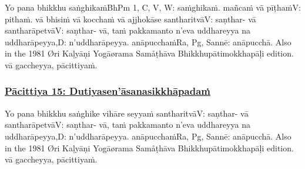 Yo pana bhikkhu saṅghikaṁ\makeatletter\hyperlink{endnote-appendix}\makeatother BhPm 1, C, V, W: saṁghikaṁ. mañcaṁ vā pīṭhaṁ\makeatletter\hyperlink{endnote-appendix}\makeatother V: pithaṁ. vā bhisiṁ vā kocchaṁ vā ajjhokāse santharitvā\makeatletter\hyperlink{endnote-appendix}\makeatother V: saṇthar- vā santharāpetvā\makeatletter\hyperlink{endnote-appendix}\makeatother V: saṇthar- vā, taṁ pakkamanto n'eva uddhareyya na uddharāpeyya,\makeatletter\hyperlink{endnote-appendix}\makeatother D: n'uddharāpeyya. anāpucchaṁ\makeatletter\hyperlink{endnote-appendix}\makeatother Ra, Pg, Sannē: anāpucchā. Also in the 1981 Øri Kaḷyāṇi Yogāørama Samåṭhāva Bhikkhupātimokkhapāḷi edition. vā gaccheyya, pācittiyaṁ.



\subsubsection*{\hyperref[exp15]{Pācittiya 15: Dutiyasen'āsanasikkhāpadaṁ}}
\label{pac15}

Yo pana bhikkhu saṅghike vihāre seyyaṁ santharitvā\makeatletter\hyperlink{endnote-appendix}\makeatother V: saṇthar- vā santharāpetvā\makeatletter\hyperlink{endnote-appendix}\makeatother V: saṇthar- vā, taṁ pakkamanto n'eva uddhareyya na uddharāpeyya,\makeatletter\hyperlink{endnote-appendix}\makeatother D: n'uddharāpeyya. anāpucchaṁ\makeatletter\hyperlink{endnote-appendix}\makeatother Ra, Pg, Sannē: anāpucchā. Also in the 1981 Øri Kaḷyāṇi Yogāørama Samåṭhāva Bhikkhupātimokkhapāḷi edition. vā gaccheyya, pācittiyaṁ.



